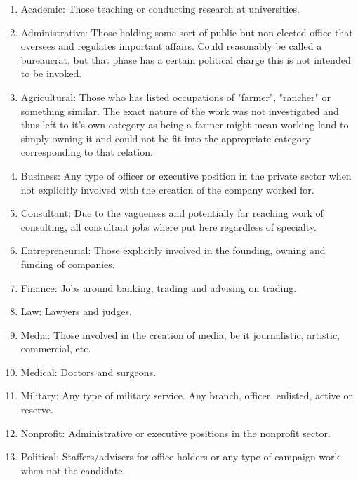 \documentclass[11pt]{article}
\begin{document}
\begin{enumerate}
\begin{enumerate}
\item Academic: Those teaching or conducting research at universities.

\item Administrative: Those holding some sort of public but non-elected office that oversees and regulates important affairs. Could reasonably be called a bureaucrat, but that phase has a certain political charge this is not intended to be invoked.

\item Agricultural: Those who has listed occupations of "farmer", "rancher" or something similar. The exact nature of the work was not investigated and thus left to it's own category as being a farmer might mean working land to simply owning it and could not be fit into the appropriate category corresponding to that relation.

\item Business: Any type of officer or executive position in the private sector when not explicitly involved with the creation of the company worked for.

\item Consultant: Due to the vagueness and potentially far reaching work of consulting, all consultant jobs where put here regardless of specialty.

\item Entrepreneurial: Those explicitly involved in the founding, owning and funding of companies.

\item Finance: Jobs around banking, trading and advising on trading.

\item Law: Lawyers and judges.

\item Media: Those involved in the creation of media, be it journalistic, artistic, commercial, etc.

\item Medical: Doctors and surgeons.

\item Military: Any type of military service. Any branch, officer, enlisted, active or reserve.

\item Nonprofit: Administrative or executive positions in the nonprofit sector.

\item Political: Staffers/advisers for office holders or any type of campaign work when not the candidate. 


\end{enumerate}
\end{enumerate}
\end{document}
